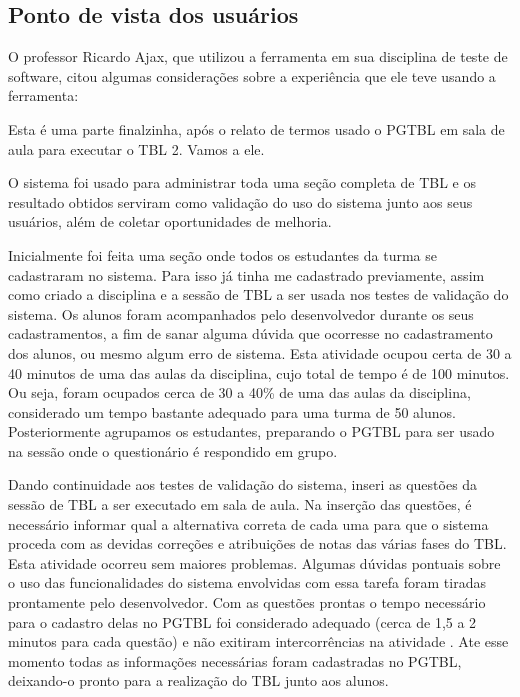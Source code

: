\subsection{Ponto de vista dos usuários}

O professor Ricardo Ajax, que utilizou a ferramenta em sua disciplina de teste de software, citou algumas
considerações sobre a experiência que ele teve usando a ferramenta:

\begin{quoting}[rightmargin=0cm, leftmargin=4cm]
  \noindent
  Esta é uma parte finalzinha, após o relato de termos usado o PGTBL em sala de aula para executar o TBL 2. Vamos a
  ele.

  \noindent
  O sistema foi usado para administrar toda uma seção completa de TBL e os resultado obtidos serviram como validação
  do uso do sistema junto aos seus usuários, além de coletar oportunidades de melhoria.

  \noindent
  Inicialmente foi feita uma seção onde todos os estudantes da turma se cadastraram no sistema. Para isso já tinha me
  cadastrado previamente, assim como criado a disciplina e a sessão de TBL a ser
  usada nos testes de validação do sistema. Os alunos foram acompanhados pelo desenvolvedor durante os seus
  cadastramentos, a fim de sanar alguma dúvida que ocorresse no cadastramento dos alunos, ou mesmo algum erro de
  sistema. Esta atividade ocupou certa de 30 a 40 minutos de uma das aulas da disciplina, cujo total de tempo é de 100
  minutos. Ou seja, foram ocupados cerca de 30 a 40\% de uma das aulas da disciplina, considerado um tempo bastante
  adequado para uma turma de 50 alunos. Posteriormente agrupamos os estudantes, preparando
  o PGTBL para ser usado na sessão onde o questionário é respondido em grupo.

  \noindent
  Dando continuidade aos testes de validação do sistema, inseri as questões da sessão de TBL a ser
  executado em sala de aula. Na inserção das questões, é necessário informar qual a alternativa correta de cada uma para
  que o sistema proceda com as devidas correções e atribuições de notas das várias fases do TBL. Esta atividade ocorreu
  sem maiores problemas. Algumas dúvidas pontuais sobre o uso das funcionalidades do sistema envolvidas com essa tarefa
  foram tiradas prontamente pelo desenvolvedor.  Com as questões prontas o tempo necessário para o cadastro delas no
  PGTBL foi considerado adequado (cerca de 1,5 a 2 minutos para cada questão) e não exitiram intercorrências na
  atividade . Ate esse momento todas as informações necessárias foram cadastradas no PGTBL, deixando-o pronto para a
  realização do TBL junto aos alunos.


\end{quoting}
